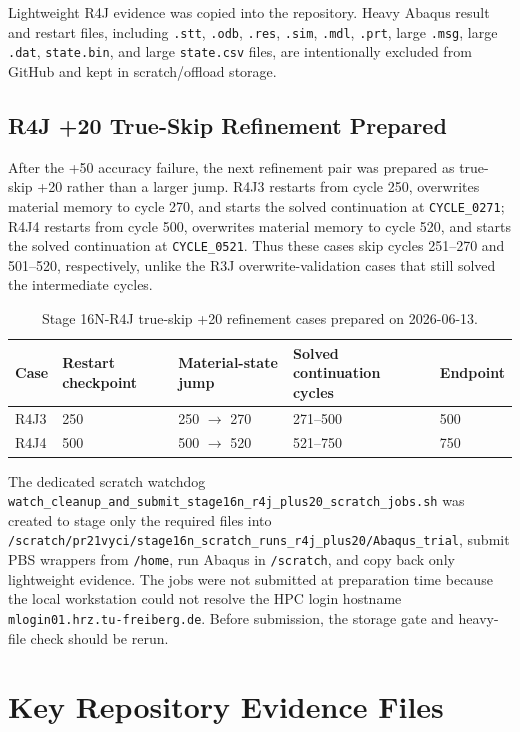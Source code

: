\documentclass[11pt,a4paper]{article}
\newcommand{\code}[1]{\texttt{#1}}
\begin{document}
Lightweight R4J evidence was copied into the repository. Heavy Abaqus result and restart files, including \code{.stt}, \code{.odb}, \code{.res}, \code{.sim}, \code{.mdl}, \code{.prt}, large \code{.msg}, large \code{.dat}, \code{state.bin}, and large \code{state.csv} files, are intentionally excluded from GitHub and kept in scratch/offload storage.

\subsection{R4J +20 True-Skip Refinement Prepared}

After the +50 accuracy failure, the next refinement pair was prepared as true-skip +20 rather than a larger jump. R4J3 restarts from cycle 250, overwrites material memory to cycle 270, and starts the solved continuation at \code{CYCLE\_0271}; R4J4 restarts from cycle 500, overwrites material memory to cycle 520, and starts the solved continuation at \code{CYCLE\_0521}. Thus these cases skip cycles 251--270 and 501--520, respectively, unlike the R3J overwrite-validation cases that still solved the intermediate cycles.

\begin{table}[H]
\centering
\caption{Stage 16N-R4J true-skip +20 refinement cases prepared on 2026-06-13.}
\begin{tabular}{lllll}
\toprule
Case & Restart checkpoint & Material-state jump & Solved continuation cycles & Endpoint \\
\midrule
R4J3 & 250 & 250 $\rightarrow$ 270 & 271--500 & 500 \\
R4J4 & 500 & 500 $\rightarrow$ 520 & 521--750 & 750 \\
\bottomrule
\end{tabular}
\end{table}

The dedicated scratch watchdog \code{watch\_cleanup\_and\_submit\_stage16n\_r4j\_plus20\_scratch\_jobs.sh} was created to stage only the required files into \code{/scratch/pr21vyci/stage16n\_scratch\_runs\_r4j\_plus20/Abaqus\_trial}, submit PBS wrappers from \code{/home}, run Abaqus in \code{/scratch}, and copy back only lightweight evidence. The jobs were not submitted at preparation time because the local workstation could not resolve the HPC login hostname \code{mlogin01.hrz.tu-freiberg.de}. Before submission, the storage gate and heavy-file check should be rerun.

\appendix
\section{Key Repository Evidence Files}
\end{document}
